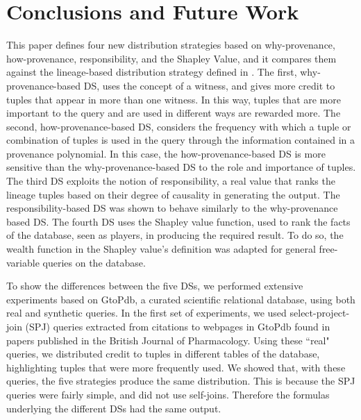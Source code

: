 \documentclass[preprint,12pt,sort&compress]{elsarticle}
\newcommand{\rtwo}[1]{\textcolor{reviewer2}{#1}}
\begin{document}
\section{Conclusions and Future Work}
\label{section:conclusions}

This paper 
defines four new distribution strategies based on why-provenance, how-provenance, responsibility, and the Shapley Value, and it compares them against the lineage-based distribution strategy defined in \cite{dosso2020data}. 
The first, why-provenance-based DS, uses the concept of a witness, and gives more credit to tuples that appear in more than one witness. 
In this way, tuples that are more important to the query and are used in different ways are rewarded more. %
The second, how-provenance-based DS, considers the frequency with which a tuple or combination of tuples is used in the query through the information contained in a provenance polynomial. In this case, the how-provenance-based DS is more sensitive than the why-provenance-based DS to the role and importance of tuples.
\rtwo{The third DS exploits the notion of responsibility, a real value that ranks the lineage tuples based on their degree of causality in generating the output. The responsibility-based DS was shown to behave similarly to the why-provenance based DS.}
\rtwo{The fourth DS uses the Shapley value function, used to rank the facts of the database, seen as players, in producing the required result. To do so, the wealth function in the Shapley value's definition was adapted for general free-variable queries on the database.}

To show the differences between the five DSs, we performed extensive experiments based on GtoPdb, a curated scientific relational database, using both real and synthetic queries. 
In the first set of experiments, we used select-project-join (SPJ) queries extracted from citations to webpages in GtoPdb found in papers published in the British Journal of Pharmacology. 
Using these ``real" queries, we distributed credit to tuples in different tables of the database, highlighting tuples that were more frequently used. 
We showed that, with these queries, the five strategies produce the same distribution. This is because the SPJ queries were fairly simple, and did not use self-joins. Therefore the formulas underlying the different DSs had the same output.
\end{document}
